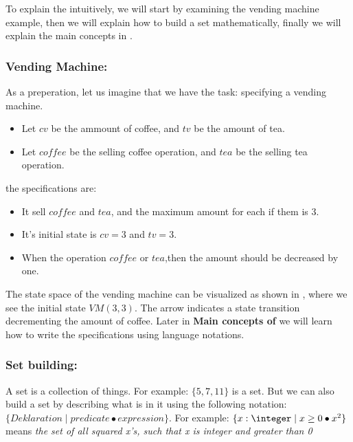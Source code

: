 To explain the \oz{} intuitively, we will start by examining the vending machine example, then we will explain how to build a set mathematically, finally we will explain the main concepts in \oz{}. 

\subsubsection{Vending Machine:}
As a preperation, let us imagine that we have the task: specifying a vending machine.
\begin{itemize}
\item Let $cv$ be the ammount of coffee, and $tv$ be the amount of tea.
\item Let $coffee$ be the selling coffee operation, and $tea$ be the selling tea operation.
\end{itemize}
the specifications are:
\begin{itemize}
\item It sell $coffee$ and $tea$, and the maximum amount for each if them is 3.
\item It's initial state is  $cv = 3$ and $tv = 3$.
\item When the operation $coffee$ or $tea$,then the amount should be decreased by one.
\end{itemize} 
The state space of the vending machine can be visualized as shown in , where we see the initial state $VM(3,3)$. The arrow indicates a state transition decrementing the amount of coffee. Later in \textbf{Main concepts of \oz{}} we will learn how to write the specifications using \oz{} language notations.


\subsubsection{Set building:} A set is a collection of things. For example: $\{5, 7, 11\}$ is a set.
But we can also build a set by describing what is in it using the following notation: $\{Deklaration \mid predicate \bullet expression \}$.  For example: $\{x: \integer \mid x \geq 0 \bullet x^{2}\}$ means \textit{the set of all  squared x's, such that x is integer and greater than 0}

	
